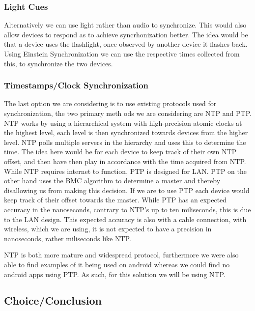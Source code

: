 \subsubsection{Light Cues}
Alternatively we can use light rather than audio to synchronize.
This would also allow devices to respond as to achieve syncrhonization better.
The idea would be that a device uses the flashlight, once observed by another device it flashes back.
Using Einstein Synchronization we can use the respective times collected from this, to synchronize the two devices.
\subsubsection{Timestamps/Clock Synchronization}
The last option we are considering is to use existing protocols used for synchronization, the two primary meth ods we are considering are \ac{NTP} and \ac{PTP}.
\ac{NTP} works by using a hierarchical system with high-precision atomic clocks at the highest level, each level is then synchronized towards devices from the higher level.
\ac{NTP} polls multiple servers in the hierarchy and uses this to determine the time.
The idea here would be for each device to keep track of their own \ac{NTP} offset, and then have then play in accordance with the time acquired from \ac{NTP}. 
While \ac{NTP} requires internet to function, \ac{PTP} is designed for LAN.
\ac{PTP} on the other hand uses the \ac{BMC} algorithm to determine a master and thereby disallowing us from making this decision.
If we are to use \ac{PTP} each device would keep track of their offset towards the master.
While \ac{PTP} has an expected accuracy in the nanoseconds, contrary to NTP's up to ten miliseconds, this is due to the LAN design.
This expected accuracy is also with a cable connection, with wireless, which we are using, it is not expected to have a precision in nanoseconds, rather miliseconds like \ac{NTP}.

\ac{NTP} is both more mature and widespread protocol, furthermore we were also able to find examples of it being used on android whereas we could find no android apps using \ac{PTP}.
As such, for this solution we will be using \ac{NTP}.


\subsection{Choice/Conclusion}
